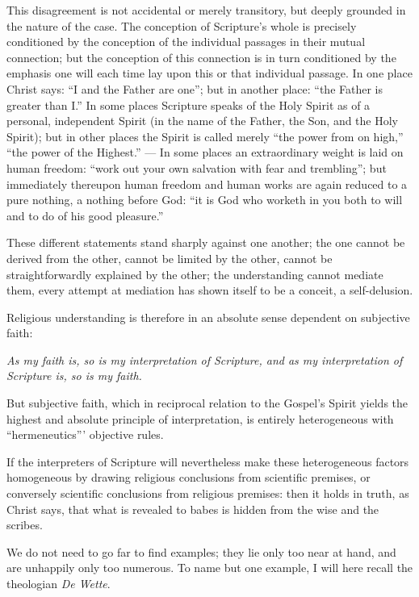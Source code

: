 \documentclass[12pt,a4paper]{book}
\begin{document}
This disagreement is not accidental or merely transitory, but deeply grounded in the
nature of the case. The conception of Scripture's whole is precisely conditioned by
the conception of the individual passages in their mutual connection; but the
conception of this connection is in turn conditioned by the emphasis one will each
time lay upon this or that individual passage. In one place Christ says: ``I and the
Father are one''; but in another place: ``the Father is greater than I.'' In some
places Scripture speaks of the Holy Spirit as of a personal, independent Spirit (in
the name of the Father, the Son, and the Holy Spirit); but in other places the
Spirit is called merely ``the power from on high,'' ``the power of the Highest.''
--- In some places an extraordinary weight is laid on human freedom: ``work out your
own salvation with fear and trembling''; but immediately thereupon human freedom and
human works are again reduced to a pure nothing, a nothing before God: ``it is God
who worketh in you both to will and to do of his good pleasure.''

These different statements stand sharply against one another; the one cannot be
derived from the other, cannot be limited by the other, cannot be straightforwardly
explained by the other; the understanding cannot mediate them, every attempt at
mediation has shown itself to be a conceit, a self-delusion.

Religious understanding is therefore in an absolute sense dependent on subjective
faith:

\emph{As my faith is, so is my interpretation of Scripture, and as my interpretation
of Scripture is, so is my faith.}

But subjective faith, which in reciprocal relation to the Gospel's Spirit yields the
highest and absolute principle of interpretation, is entirely heterogeneous with
``hermeneutics''' objective rules.

If the interpreters of Scripture will nevertheless make these heterogeneous factors
homogeneous by drawing religious conclusions from scientific
premises, or conversely scientific conclusions from religious premises: then it
holds in truth, as Christ says, that what is revealed to babes is hidden from the
wise and the scribes.

We do not need to go far to find examples; they lie only too near at hand, and are
unhappily only too numerous. To name but one example, I will here recall the
theologian \textit{De Wette}.
\end{document}
